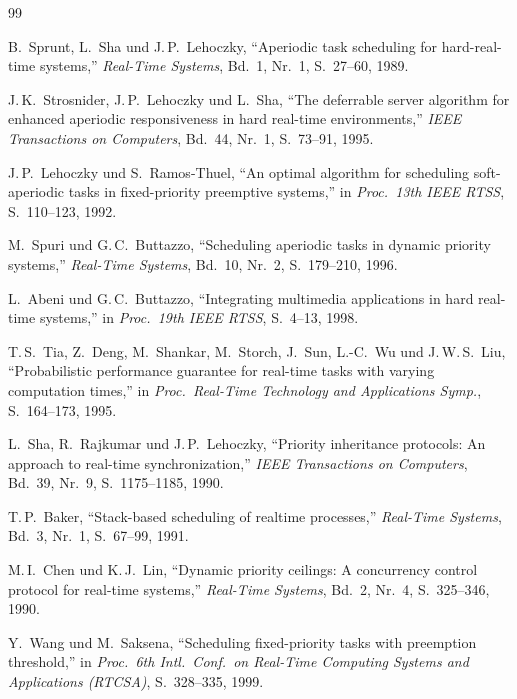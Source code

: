 ﻿\documentclass[a4paper,12pt]{report}
\theoremstyle{definition}
\begin{document}
\begin{thebibliography}{99}

B.\ Sprunt, L.\ Sha und J.\,P.\ Lehoczky,
``Aperiodic task scheduling for hard-real-time systems,''
\textit{Real-Time Systems}, Bd.~1, Nr.~1, S.~27--60, 1989.

J.\,K.\ Strosnider, J.\,P.\ Lehoczky und L.\ Sha,
``The deferrable server algorithm for enhanced aperiodic responsiveness
in hard real-time environments,''
\textit{IEEE Transactions on Computers}, Bd.~44, Nr.~1, S.~73--91, 1995.

J.\,P.\ Lehoczky und S.\ Ramos-Thuel,
``An optimal algorithm for scheduling soft-aperiodic tasks in
fixed-priority preemptive systems,''
in \textit{Proc.\ 13th IEEE RTSS}, S.~110--123, 1992.

M.\ Spuri und G.\,C.\ Buttazzo,
``Scheduling aperiodic tasks in dynamic priority systems,''
\textit{Real-Time Systems}, Bd.~10, Nr.~2, S.~179--210, 1996.

L.\ Abeni und G.\,C.\ Buttazzo,
``Integrating multimedia applications in hard real-time systems,''
in \textit{Proc.\ 19th IEEE RTSS}, S.~4--13, 1998.

T.\,S.\ Tia, Z.\ Deng, M.\ Shankar, M.\ Storch, J.\ Sun, L.-C.\ Wu
und J.\,W.\,S.\ Liu,
``Probabilistic performance guarantee for real-time tasks with
varying computation times,''
in \textit{Proc.\ Real-Time Technology and Applications Symp.},
S.~164--173, 1995.


L.\ Sha, R.\ Rajkumar und J.\,P.\ Lehoczky,
``Priority inheritance protocols: An approach to real-time synchronization,''
\textit{IEEE Transactions on Computers}, Bd.~39, Nr.~9, S.~1175--1185, 1990.

T.\,P.\ Baker,
``Stack-based scheduling of realtime processes,''
\textit{Real-Time Systems}, Bd.~3, Nr.~1, S.~67--99, 1991.

M.\,I.\ Chen und K.\,J.\ Lin,
``Dynamic priority ceilings: A concurrency control protocol for
real-time systems,''
\textit{Real-Time Systems}, Bd.~2, Nr.~4, S.~325--346, 1990.


Y.\ Wang und M.\ Saksena,
``Scheduling fixed-priority tasks with preemption threshold,''
in \textit{Proc.\ 6th Intl.\ Conf.\ on Real-Time Computing Systems
and Applications (RTCSA)}, S.~328--335, 1999.


\end{thebibliography}
\end{document}
